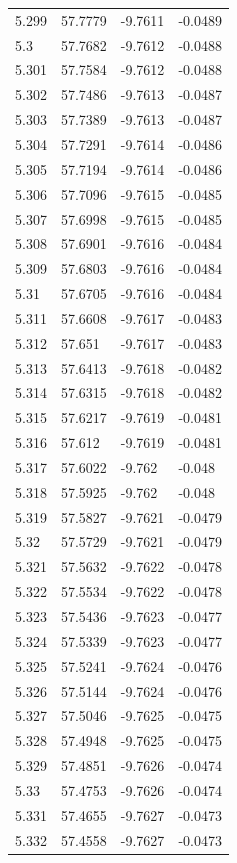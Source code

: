 \begin{tabular}{llll}
5.299 & 57.7779 & -9.7611 & -0.0489 \\
5.3 & 57.7682 & -9.7612 & -0.0488 \\
5.301 & 57.7584 & -9.7612 & -0.0488 \\
5.302 & 57.7486 & -9.7613 & -0.0487 \\
5.303 & 57.7389 & -9.7613 & -0.0487 \\
5.304 & 57.7291 & -9.7614 & -0.0486 \\
5.305 & 57.7194 & -9.7614 & -0.0486 \\
5.306 & 57.7096 & -9.7615 & -0.0485 \\
5.307 & 57.6998 & -9.7615 & -0.0485 \\
5.308 & 57.6901 & -9.7616 & -0.0484 \\
5.309 & 57.6803 & -9.7616 & -0.0484 \\
5.31 & 57.6705 & -9.7616 & -0.0484 \\
5.311 & 57.6608 & -9.7617 & -0.0483 \\
5.312 & 57.651 & -9.7617 & -0.0483 \\
5.313 & 57.6413 & -9.7618 & -0.0482 \\
5.314 & 57.6315 & -9.7618 & -0.0482 \\
5.315 & 57.6217 & -9.7619 & -0.0481 \\
5.316 & 57.612 & -9.7619 & -0.0481 \\
5.317 & 57.6022 & -9.762 & -0.048 \\
5.318 & 57.5925 & -9.762 & -0.048 \\
5.319 & 57.5827 & -9.7621 & -0.0479 \\
5.32 & 57.5729 & -9.7621 & -0.0479 \\
5.321 & 57.5632 & -9.7622 & -0.0478 \\
5.322 & 57.5534 & -9.7622 & -0.0478 \\
5.323 & 57.5436 & -9.7623 & -0.0477 \\
5.324 & 57.5339 & -9.7623 & -0.0477 \\
5.325 & 57.5241 & -9.7624 & -0.0476 \\
5.326 & 57.5144 & -9.7624 & -0.0476 \\
5.327 & 57.5046 & -9.7625 & -0.0475 \\
5.328 & 57.4948 & -9.7625 & -0.0475 \\
5.329 & 57.4851 & -9.7626 & -0.0474 \\
5.33 & 57.4753 & -9.7626 & -0.0474 \\
5.331 & 57.4655 & -9.7627 & -0.0473 \\
5.332 & 57.4558 & -9.7627 & -0.0473 \\

\end{tabular}

